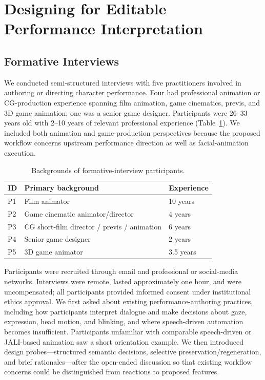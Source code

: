\section{Designing for Editable Performance Interpretation}

\subsection{Formative Interviews}

We conducted semi-structured interviews with five practitioners involved in authoring or directing character performance. Four had professional animation or CG-production experience spanning film animation, game cinematics, previs, and 3D game animation; one was a senior game designer. Participants were 26--33 years old with 2--10 years of relevant professional experience (Table~\ref{tab:formative-participants}). We included both animation and game-production perspectives because the proposed workflow concerns upstream performance direction as well as facial-animation execution.

\begin{table}[t]
    \centering
    \caption{Backgrounds of formative-interview participants.}
    \label{tab:formative-participants}
    \begin{tabular}{lll}
        \toprule
        \textbf{ID} & \textbf{Primary background} & \textbf{Experience} \\
        \midrule
        P1 & Film animator & 10 years \\
        P2 & Game cinematic animator/director & 4 years \\
        P3 & CG short-film director / previs / animation & 6 years \\
        P4 & Senior game designer & 2 years \\
        P5 & 3D game animator & 3.5 years \\
        \bottomrule
    \end{tabular}
\end{table}

Participants were recruited through email and professional or social-media networks. Interviews were remote, lasted approximately one hour, and were uncompensated; all participants provided informed consent under institutional ethics approval. We first asked about existing performance-authoring practices, including how participants interpret dialogue and make decisions about gaze, expression, head motion, and blinking, and where speech-driven automation becomes insufficient. Participants unfamiliar with comparable speech-driven or JALI-based animation saw a short orientation example. We then introduced design probes---structured semantic decisions, selective preservation/regeneration, and brief rationales---after the open-ended discussion so that existing workflow concerns could be distinguished from reactions to proposed features.

